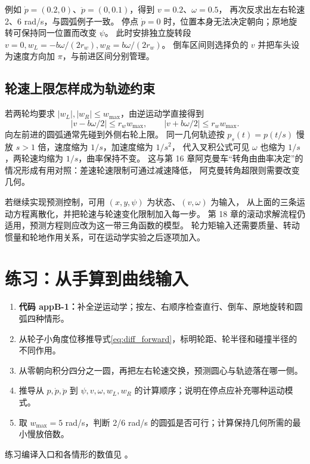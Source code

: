 例如 $\dot p=(0.2,0)$、$\ddot p=(0,0.1)$，得到 $v=0.2$、$\omega=0.5$，
再次反求出左右轮速 2、6 rad/s，与圆弧例子一致。
停点 $\dot p=0$ 时，位置本身无法决定朝向；原地旋转可保持同一位置而改变 $\psi$。
此时安排独立旋转段 $v=0,w_L=-b\omega/(2r_w),w_R=b\omega/(2r_w)$。
倒车区间则选择负的 $v$ 并把车头设为速度方向加 $\pi$，与前进区间分别管理。

\subsection{轮速上限怎样成为轨迹约束}
若两轮均要求 $|w_L|,|w_R|\le w_{\max}$，由逆运动学直接得到
\[
 |v-b\omega/2|\le r_ww_{\max},\qquad
 |v+b\omega/2|\le r_ww_{\max}.
\]
向左前进的圆弧通常先碰到外侧右轮上限。
同一几何轨迹按 $p_s(t)=p(t/s)$ 慢放 $s>1$ 倍，速度缩为 $1/s$，加速度缩为 $1/s^2$，
代入叉积公式可见 $\omega$ 也缩为 $1/s$，两轮速均缩为 $1/s$，曲率保持不变。
这与第 16 章阿克曼车“转角由曲率决定”的情况形成有用对照：差速轮速限制可通过减速降低，
阿克曼转角超限则需要改变几何。

若继续实现预测控制，可用 $(x,y,\psi)$ 为状态、$(v,\omega)$ 为输入，
从上面的三条运动方程离散化，并把轮速与轮速变化限制加入每一步。
第 18 章的滚动求解流程仍适用，预测方程则应改为这一带三角函数的模型。
轮力矩输入还需要质量、转动惯量和轮地作用关系，可在运动学实验之后逐项加入。

\section{练习：从手算到曲线输入}
\begin{enumerate}
\item \textbf{代码 appB-1：}补全逆运动学；按左、右顺序检查直行、倒车、原地旋转和圆弧四种情形。
\item 从轮子小角度位移推导式\eqref{eq:diff_forward}，标明轮距、轮半径和碰撞半径的不同作用。
\item 从零朝向积分四分之一圆，再把左右轮速交换，预测圆心与轨迹落在哪一侧。
\item 推导从 $p,\dot p,\ddot p$ 到 $\psi,v,\omega,w_L,w_R$ 的计算顺序；说明在停点应补充哪种运动模式。
\item 取 $w_{\max}=5$ rad/s，判断 2/6 rad/s 的圆弧是否可行；计算保持几何所需的最小慢放倍数。
\end{enumerate}
练习编译入口和各情形的数值见 。
